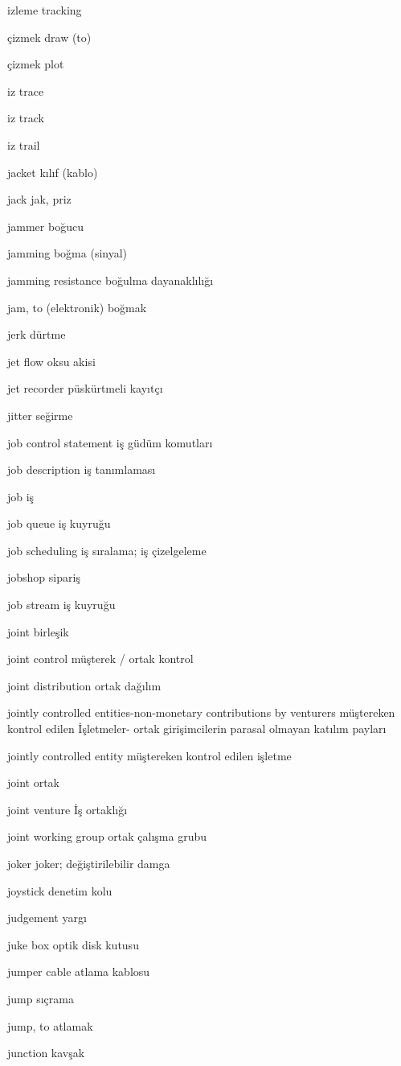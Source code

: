 \documentclass[12pt,fleqn]{article}\usepackage{../../common}
\begin{document}
izleme tracking

çizmek draw (to)

çizmek plot

iz trace

iz track

iz trail

jacket kılıf (kablo)

jack jak, priz

jammer boğucu

jamming boğma (sinyal)

jamming resistance boğulma dayanaklılığı

jam, to (elektronik) boğmak

jerk dürtme

jet flow oksu akisi

jet recorder püskürtmeli kayıtçı

jitter seğirme

job control statement iş güdüm komutları

job description iş tanımlaması

job iş

job queue iş kuyruğu

job scheduling iş sıralama; iş çizelgeleme

jobshop sipariş

job stream iş kuyruğu

joint birleşik

joint control müşterek / ortak kontrol

joint distribution ortak dağılım

jointly controlled entities-non-monetary contributions by venturers müştereken kontrol edilen İşletmeler- ortak girişimcilerin parasal olmayan katılım payları 

jointly controlled entity müştereken kontrol edilen işletme

joint ortak

joint venture İş ortaklığı

joint working group ortak çalışma grubu

joker joker; değiştirilebilir damga

joystick denetim kolu

judgement yargı

juke box optik disk kutusu

jumper cable atlama kablosu

jump sıçrama

jump, to atlamak

junction kavşak
\end{document}
